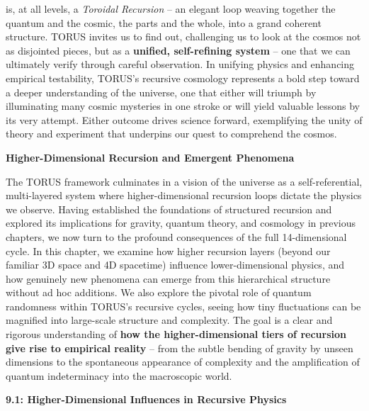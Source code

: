 \documentclass[]{article}
\begin{document}
is, at all levels, a \emph{Toroidal Recursion} -- an elegant loop
weaving together the quantum and the cosmic, the parts and the whole,
into a grand coherent structure. TORUS invites us to find out,
challenging us to look at the cosmos not as disjointed pieces, but as a
\textbf{unified, self-refining system} -- one that we can ultimately
verify through careful observation​. In unifying physics and enhancing
empirical testability, TORUS's recursive cosmology represents a bold
step toward a deeper understanding of the universe, one that either will
triumph by illuminating many cosmic mysteries in one stroke or will
yield valuable lessons by its very attempt​. Either outcome drives
science forward, exemplifying the unity of theory and experiment that
underpins our quest to comprehend the cosmos.

\textbf{Higher-Dimensional Recursion and Emergent Phenomena}

The TORUS framework culminates in a vision of the universe as a
self-referential, multi-layered system where higher-dimensional
recursion loops dictate the physics we observe. Having established the
foundations of structured recursion and explored its implications for
gravity, quantum theory, and cosmology in previous chapters, we now turn
to the profound consequences of the full 14-dimensional cycle. In this
chapter, we examine how higher recursion layers (beyond our familiar 3D
space and 4D spacetime) influence lower-dimensional physics, and how
genuinely new phenomena can emerge from this hierarchical structure
without ad hoc additions. We also explore the pivotal role of quantum
randomness within TORUS's recursive cycles, seeing how tiny fluctuations
can be magnified into large-scale structure and complexity. The goal is
a clear and rigorous understanding of \textbf{how the higher-dimensional
tiers of recursion give rise to empirical reality} -- from the subtle
bending of gravity by unseen dimensions to the spontaneous appearance of
complexity and the amplification of quantum indeterminacy into the
macroscopic world.

\textbf{9.1: Higher-Dimensional Influences in Recursive Physics}
\end{document}
